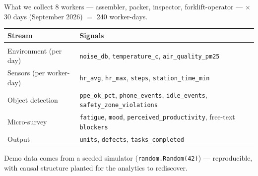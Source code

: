 \documentclass[aspectratio=169]{beamer}
\begin{document}
\begin{frame}{What we collect}
  8 workers --- assembler, packer, inspector, forklift-operator --- $\times$
  30 days (September 2026) $=$ 240 worker-days.
  \vspace{1ex}

  {\small
  \begin{tabular}{@{}p{}>{\raggedright\arraybackslash}p{}@{}}
    \textbf{Stream} & \textbf{Signals}\\
    \hline\\[-1.8ex]
    Environment (per day) & \texttt{noise\_db}, \texttt{temperature\_c}, \texttt{air\_quality\_pm25}\\[0.4ex]
    Sensors (per worker-day) & \texttt{hr\_avg}, \texttt{hr\_max}, \texttt{steps}, \texttt{station\_time\_min}\\[0.4ex]
    Object detection & \texttt{ppe\_ok\_pct}, \texttt{phone\_events}, \texttt{idle\_events}, \texttt{safety\_zone\_violations}\\[0.4ex]
    Micro-survey & \texttt{fatigue}, \texttt{mood}, \texttt{perceived\_productivity}, free-text \texttt{blockers}\\[0.4ex]
    Output & \texttt{units}, \texttt{defects}, \texttt{tasks\_completed}\\
  \end{tabular}}
  \vspace{1ex}

  Demo data comes from a seeded simulator (\texttt{random.Random(42)}) ---
  reproducible, with causal structure planted for the analytics to rediscover.
\end{frame}
\end{document}
